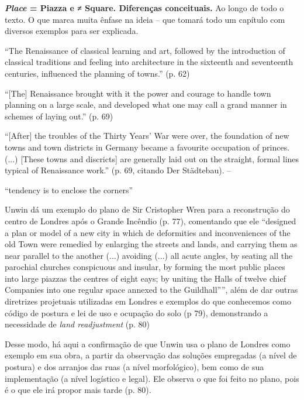 \documentclass[12pt, a4paper]{book} %
\begin{document}
        \textbf{\textit{Place} = Piazza e ≠ Square. Diferenças conceituais.} Ao longo de todo o texto. O que marca muita ênfase na ideia – que tomará todo um capítulo com diversos exemplos para ser explicada. 

        ``The Renaissance of classical learning and art, followed by the introduction of classical traditions and feeling into architecture in the sixteenth and seventeenth centuries, influenced the planning of towns.'' (p. 62)

        ``[The] Renaissance brought with it the power and courage to handle town planning on a large scale, and developed what one may call a grand manner in schemes of laying out.'' (p. 69)

        ``[After] the troubles of the Thirty Years' War were over, the foundation of new towns and town districts in Germany became a favourite occupation of princes. (...) [These towns and discricts] are generally laid out on the straight, formal lines typical of Renaissance work.'' (p. 69, citando Der Städtebau). – %

        ``tendency is to enclose the corners''

        Unwin dá um exemplo do plano de Sir Cristopher Wren para a reconstrução do centro de Londres após o Grande Incêndio (p. 77), comentando que ele ``designed a plan or model of a new city in which de deformities and inconveniences of the old Town were remedied by enlarging the streets and lands, and carrying them as near parallel to the another (...) avoiding (...) all acute angles, by seating all the parochial churches conspicuous and insular, by forming the most public places into large piazzas the centres of eight eays; by uniting the Halls of twelve chief Companies into one regular space annexed to the Guildhall'''', além de dar outras diretrizes projetuais utilizadas em Londres e exemplos do que conhecemos como código de postura e lei de uso e ocupação do solo (p 79), demonstrando a necessidade de \textit{land readjustment} (p. 80)

        Desse modo, há aqui a confirmação de que Unwin usa o plano de Londres como exemplo em sua obra, a partir da observação das soluções empregadas (a nível de postura) e dos arranjos das ruas (a nível morfológico), bem como de sua implementação (a nível logístico e legal). Ele observa o que foi feito no plano, pois é o que ele irá propor mais tarde (p. 80).
\end{document}
